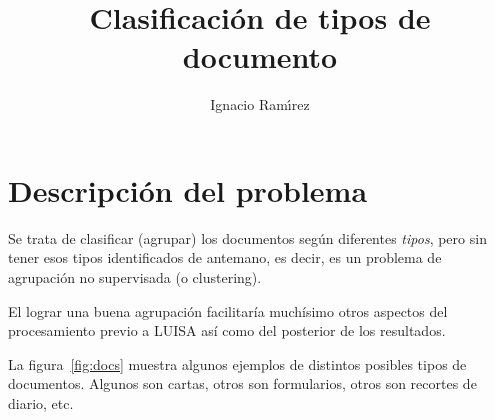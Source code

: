 \documentclass[11pt,a4paper]{article}
\author{Ignacio Ram\'{\i}rez}
\title{Clasificación de tipos de documento}
\begin{document}
\maketitle

\section{Descripción del problema}

Se trata de clasificar (agrupar) los documentos según diferentes \emph{tipos}, pero sin tener esos tipos identificados de antemano, es decir, es un problema de agrupación no supervisada (o clustering). 

El lograr una buena agrupación facilitaría muchísimo otros aspectos del procesamiento previo a LUISA así como del posterior de los resultados.

La figura~\ref{fig:docs} muestra algunos ejemplos de distintos posibles tipos de documentos. Algunos son cartas, otros son formularios, otros son recortes de diario, etc.
\end{document}
